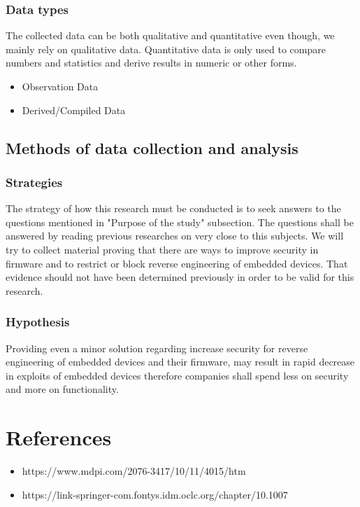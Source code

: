 \documentclass[]{report}
\begin{document}
\subsection{Data types}
The collected data can be both qualitative and quantitative even though, we mainly rely on qualitative data.
Quantitative data is only used to compare numbers and statistics and derive results in numeric or other forms.
\begin{itemize}
	\item Observation Data
	\item Derived/Compiled Data
\end{itemize}
\section{Methods of data collection and analysis}

\subsection{Strategies}
The strategy of how this research must be conducted is to seek answers to the questions mentioned in "Purpose of the study" subsection. The questions shall be answered by reading previous researches on very close to this subjects.
We will try to collect material proving that there are ways to improve security in firmware and to restrict or block reverse engineering of embedded devices. That evidence should not have been determined previously in order to be valid for this research.
\subsection{Hypothesis}
Providing even a minor solution regarding increase security for reverse engineering of embedded devices and their firmware, may result in rapid decrease in exploits of embedded devices therefore companies shall spend less on security and more on functionality.
\chapter{References}
\begin{itemize}
	\item https://www.mdpi.com/2076-3417/10/11/4015/htm
	\item https://link-springer-com.fontys.idm.oclc.org/chapter/10.1007%
\end{itemize}
\end{document}
